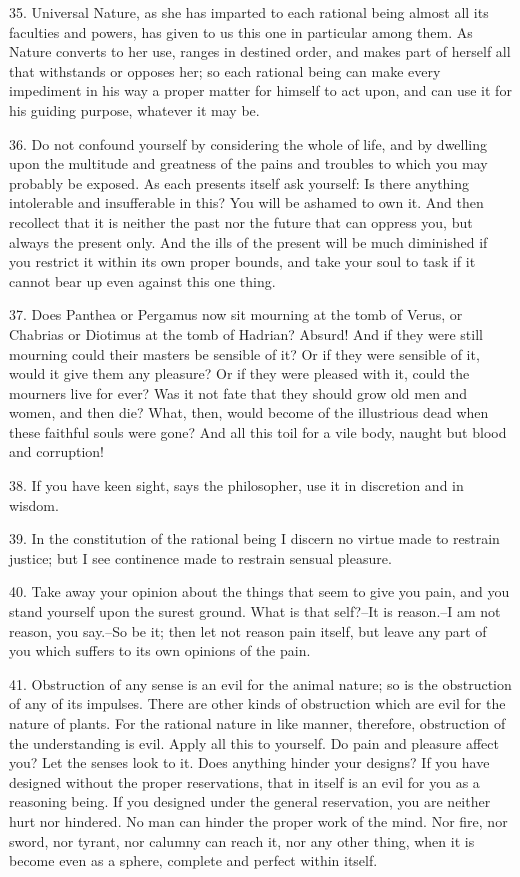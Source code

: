 \documentclass{book}
\begin{document}
35. Universal Nature, as she has imparted to each rational being
almost all its faculties and powers, has given to us this one in
particular among them. As Nature converts to her use, ranges in
destined order, and makes part of herself all that withstands or
opposes her; so each rational being can make every impediment in his
way a proper matter for himself to act upon, and can use it for his
guiding purpose, whatever it may be.

36. Do not confound yourself by considering the whole of life, and by
dwelling upon the multitude and greatness of the pains and troubles to
which you may probably be exposed. As each presents itself ask
yourself: Is there anything intolerable and insufferable in this? You
will be ashamed to own it. And then recollect that it is neither the
past nor the future that can oppress you, but always the present
only. And the ills of the present will be much diminished if you
restrict it within its own proper bounds, and take your soul to task
if it cannot bear up even against this one thing.

37. Does Panthea or Pergamus now sit mourning at the tomb of Verus, or
Chabrias or Diotimus at the tomb of Hadrian? Absurd! And if they were
still mourning could their masters be sensible of it? Or if they were
sensible of it, would it give them any pleasure? Or if they were
pleased with it, could the mourners live for ever? Was it not fate
that they should grow old men and women, and then die? What, then,
would become of the illustrious dead when these faithful souls were
gone? And all this toil for a vile body, naught but blood and
corruption!

38. If you have keen sight, says the philosopher, use it in discretion
and in wisdom.

39. In the constitution of the rational being I discern no virtue made
to restrain justice; but I see continence made to restrain sensual
pleasure.

40. Take away your opinion about the things that seem to give you
pain, and you stand yourself upon the surest ground. What is that
self?--It is reason.--I am not reason, you say.--So be it; then
let not reason pain itself, but leave any part of you which suffers to
its own opinions of the pain.

41. Obstruction of any sense is an evil for the animal nature; so is
the obstruction of any of its impulses. There are other kinds of
obstruction which are evil for the nature of plants. For the rational
nature in like manner, therefore, obstruction of the understanding is
evil. Apply all this to yourself. Do pain and pleasure affect you? Let
the senses look to it. Does anything hinder your designs? If you have
designed without the proper reservations, that in itself is an evil
for you as a reasoning being. If you designed under the general
reservation, you are neither hurt nor hindered. No man can hinder the
proper work of the mind. Nor fire, nor sword, nor tyrant, nor calumny
can reach it, nor any other thing, when it is become even as a sphere,
complete and perfect within itself.
\end{document}
